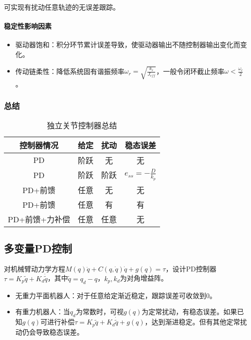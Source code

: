 \documentclass[
12pt, %
a4paper, 
oneside, %
headinclude,footinclude, %
]{scrartcl}
\begin{document}
可实现有扰动任意轨迹的无误差跟踪。
\paragraph{稳定性影响因素}
\begin{itemize}
\item 驱动器饱和：积分环节累计误差导致，使驱动器输出不随控制器输出变化而变化。
\item 传动链柔性：降低系统固有谐振频率$ \omega_r = \sqrt{\frac{k_r}{J_{eff}}} $，一般令闭环截止频率$ \omega < \frac{\omega_r}{2} $。
\end{itemize}
\subsubsection[总结]{总结}
\begin{table}[H]
\centering
\begin{tabular}{c|c|c|c}
\hline
控制器情况 & 给定 & 扰动 & 稳态误差 \\
\hline
PD & 阶跃 & 无 & 无 \\
PD & 阶跃 & 阶跃 & $ e_{ss} = -\frac{D}{k_p} $ \\
PD+前馈 & 任意 & 无 & 无 \\
PD+前馈 & 任意 & 有 & 有 \\
PD+前馈+力补偿 & 任意 & 任意 & 无 \\
\hline
\end{tabular}
\caption{独立关节控制器总结}
\end{table}
\subsection[多变量PD控制]{多变量PD控制}
对机械臂动力学方程$ M(q) \ddot{q} + C(q, \dot{q})\dot{q} + g(q) = \tau $，设计PD控制器$ \tau = K_p \tilde{q} + K_d \dot{\tilde{q}} $，其中$ \tilde{q} = q_d - q $，$ k_p, k_d $为对角增益阵。
\begin{itemize}
\item 无重力平面机器人：对于任意给定渐近稳定，跟踪误差可收敛到$ 0 $。
\item 有重力机器人：当$ q_d $为常数时，可视$ g(q) $为定常扰动，有稳态误差。如果已知$ g(q) $可进行补偿$ \tau = K_p \tilde{q} + K_d \dot{\tilde{q}} + g(q) $，达到渐进稳定。但有其他定常扰动仍会导致稳态误差。
\end{itemize}
\end{document}
